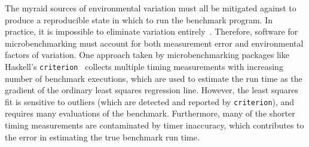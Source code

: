 \documentclass[conference]{IEEEtran}
\begin{document}
The myraid sources of environmental variation must all be mitigated against to
produce a reproducible state in which to run the benchmark program. In practice,
it is impossible to eliminate variation entirely~\cite{Alcocer2015,Barrett2016}.
Therefore, software for microbenchmarking must account for both measurement error
and environmental factors of variation.
One approach taken by microbenchmarking packages like Haskell's
\lstinline|criterion|~\cite{criterion} collects multiple timing measurements
with increasing number of benchmark executions, which are used to estimate the
run time as the gradient of the ordinary least squares regression line.
However, the least squares fit is sensitive to outliers (which are detected and
reported by \lstinline|criterion|), and requires many evaluations of the benchmark.
Furthermore, many of the shorter timing measurements are contaminated by timer
inaccuracy, which contributes to the error in estimating the true benchmark run time.
\end{document}
